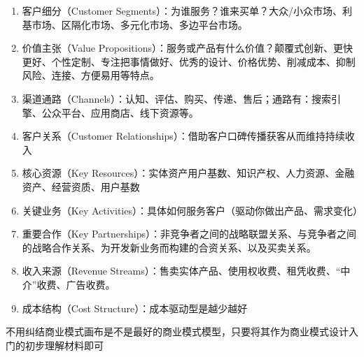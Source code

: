 \documentclass[letterpaper,10pt,english]{sphinxmanual}
\begin{document}
\begin{center}\end{center} 
\begin{enumerate}
%
\item {} 
客户细分（Customer
Segments）：为谁服务？谁来买单？大众/小众市场、利基市场、区隔化市场、多元化市场、多边平台市场。

\item {} 
价值主张（Value
Propositions）：服务或产品有什么价值？颠覆式创新、更快更好、个性定制、专注把事情做好、优秀的设计、价格优势、削减成本、抑制风险、连接、方便易用等特点。

\item {} 
渠道通路（Channels）：认知、评估、购买、传递、售后；通路有：搜索引擎、公众平台、应用商店、线下资源等。

\item {} 
客户关系（Customer
Relationships）：借助客户口碑传播获客从而维持持续收入

\item {} 
核心资源（Key
Resources）：实体资产用户基数、知识产权、人力资源、金融资产、经营资质、用户基数

\item {} 
关键业务（Key
Activities）：具体如何服务客户（驱动你做出产品、需求变化）

\item {} 
重要合作（Key
Partnerships）：非竞争者之间的战略联盟关系、与竞争者之间的战略合作关系、为开发新业务而构建的合资关系、以及买卖关系。

\item {} 
收入来源（Revenue
Streams）：售卖实体产品、使用权收费、租凭收费、“中介”收费、广告收费。

\item {} 
成本结构（Cost Structure）：成本驱动型是越少越好

\end{enumerate}

不用纠结商业模式画布是不是最好的商业模式模型，只要将其作为商业模式设计入门的初步理解材料即可
%
\begin{footnote}[408]\sphinxAtStartFootnote
{}
%
\end{footnote}
\end{document}
